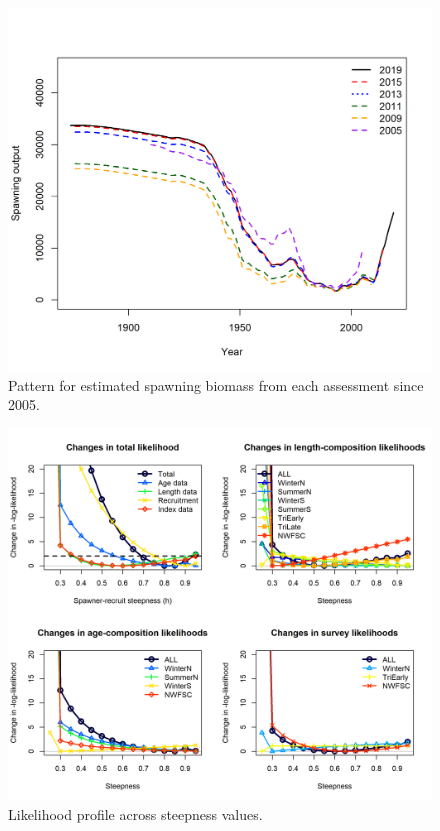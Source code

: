 \documentclass[12pt,]{article}
\begin{document}
\FloatBarrier

\begin{figure}
\centering
\includegraphics{Figures/Assessment_History.png}
\caption{Pattern for estimated spawning biomass from each assessment
since 2005. \label{fig:historical_analysis}}
\end{figure}

\FloatBarrier

\begin{figure}
\centering
\includegraphics{Figures/piner_panel_h.png}
\caption{Likelihood profile across steepness values.
\label{fig:piner_h}}
\end{figure}
\end{document}

